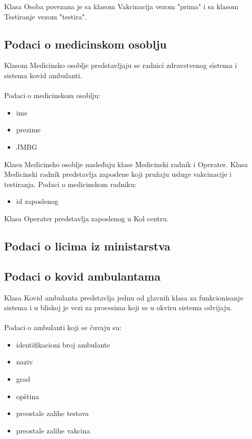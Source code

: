 \documentclass[titlepage]{article}
\begin{document}
Klasa Osoba povezana je sa klasom Vakcinacija vezom "prima" i sa klasom Testiranje vezom "testira".

\subsection{Podaci o medicinskom osoblju}
Klasom Medicinsko osoblje predstavljaju se radnici zdravstvenog sistema i sistema kovid ambulanti.\\ \\
Podaci o medicinskom osoblju:
\begin{itemize}
    \item ime
    \item prezime
    \item JMBG
\end{itemize}
Klasu Medicinsko osoblje nasleđuju klase Medicinski radnik i Operater. Klasa Medicinski radnik predstavlja zaposlene koji pružaju usluge vakcinacije i testiranja.
Podaci o medicinskom radniku:
\begin{itemize}
    \item id zaposlenog
\end{itemize}
Klasa Operater predstavlja zaposlenog u Kol centru.
\subsection{Podaci o licima iz ministarstva}

\subsection{Podaci o kovid ambulantama}

Klasa Kovid ambulanta predstavlja jednu od glavnih klasa za funkcionisanje sistema i u bliskoj je vezi za procesima koji se u okviru sistema odvijaju.\\ \\
Podaci o ambulanti koji se čuvaju su:

\begin{itemize}
    \item identifikacioni broj ambulante
    \item naziv
    \item grad
    \item opština
    \item preostale zalihe testova
    \item preostale zalihe vakcina
\end{itemize}
\end{document}
